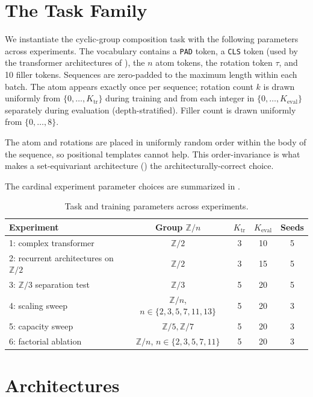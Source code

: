 \documentclass[11pt]{article}
\theoremstyle{definition}
\newcommand{\Z}{\mathbb{Z}}
\begin{document}
\section{The Task Family}
\label{sec:task}

We instantiate the cyclic-group composition task with the following
parameters across experiments. The vocabulary contains a
\texttt{PAD} token, a \texttt{CLS} token (used by the transformer
architectures of ), the $n$ atom tokens, the rotation
token $\tau$, and 10 filler tokens. Sequences are zero-padded to the
maximum length within each batch. The atom appears exactly once per
sequence; rotation count $k$ is drawn uniformly from
$\{0, \ldots, K_\text{tr}\}$ during training and from each integer in
$\{0, \ldots, K_\text{eval}\}$ separately during evaluation
(depth-stratified). Filler count is drawn uniformly from
$\{0, \ldots, 8\}$.

The atom and rotations are placed in uniformly random order within
the body of the sequence, so positional templates cannot help. This
order-invariance is what makes a set-equivariant architecture
() the architecturally-correct choice.

The cardinal experiment parameter choices are summarized in
.

\begin{table}[h]
\centering
\caption{Task and training parameters across experiments.}
\label{tab:task-params}
\begin{tabular}{lcccc}
\toprule
Experiment & Group $\Z/n$ & $K_\mathrm{tr}$ & $K_\mathrm{eval}$ & Seeds \\
\midrule
1: complex transformer & $\Z/2$ & 3  & 10 & 5 \\
2: recurrent architectures on $\Z/2$ & $\Z/2$ & 3  & 15 & 5 \\
3: $\Z/3$ separation test & $\Z/3$ & 5  & 20 & 5 \\
4: scaling sweep & $\Z/n$, $n\in\{2,3,5,7,11,13\}$ & 5 & 20 & 3 \\
5: capacity sweep & $\Z/5, \Z/7$ & 5 & 20 & 3 \\
6: factorial ablation & $\Z/n$, $n\in\{2,3,5,7,11\}$ & 5 & 20 & 3 \\
\bottomrule
\end{tabular}
\end{table}


\section{Architectures}
\label{sec:architectures}
\end{document}
